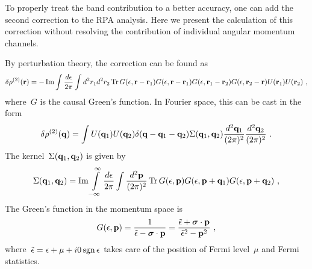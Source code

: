 \documentclass[preprint,aps,prb]{revtex4}
\begin{document}
To properly treat the band contribution to a better accuracy, one can
add the second correction to the RPA analysis. Here we present
the calculation of this correction without resolving the contribution
of individual angular momentum channels. 

By perturbation theory, the correction can be found as
\begin{equation}
\label{U2-initial}
\delta \rho^{(2)}({\bf r})
= -\mathop{\rm Im}\nolimits \int \frac{d\epsilon}{2\pi}
\int d^2 r_1 d^2 r_2 
\mathop{\rm Tr}\nolimits G(\epsilon, {\bf r} - {\bf r}_1 ) 
G(\epsilon, {\bf r} - {\bf r}_1) G(\epsilon, {\bf r}_1 - {\bf r}_2)
G(\epsilon, {\bf r}_2 - {\bf r}) U({\bf r}_1) U({\bf r}_2)
\ , 
\end{equation}
where~$G$ is the causal Green's function. 
In Fourier space, this can be cast in the form
\begin{equation}
\delta \rho^{(2)} ({\bf q}) = \int U({\bf q}_1) U({\bf q}_2) 
\delta({\bf q} - {\bf q}_1 - {\bf q}_2) \Sigma ({\bf q}_1, {\bf q}_2)
\frac{d^2{\bf q}_1}{(2\pi)^2}
\frac{d^2{\bf q}_2}{(2\pi)^2}
\ .
\end{equation}
The kernel~$\Sigma({\bf q}_1, {\bf q}_2)$ is given by 
\begin{equation}
\label{U2-momentum}
\Sigma({\bf q}_1, {\bf q}_2) 
=  \mathop{\rm Im}
   \int\limits_{-\infty}^{\infty} \frac{d\epsilon}{2\pi}
   \int\frac{d^2{\bf p}}{(2\pi)^2}
   \mathop{\rm Tr}\nolimits G(\epsilon, {\bf p}) G(\epsilon, {\bf p} +
   {\bf q}_1) G(\epsilon, {\bf p} + {\bf q}_2)
\ , 
\end{equation}
The Green's function in the momentum space is
\begin{equation}
G(\epsilon, {\bf p}) = \frac{1}{{\tilde\epsilon} - {\bm \sigma} \cdot {\bf p}}
= \frac{{\tilde\epsilon} + {\bm \sigma} \cdot {\bf p}}{
   {\tilde\epsilon}^2 - {\bf p}^2
   }
   \ , 
\end{equation}
where~$\tilde{\epsilon} = \epsilon + \mu + i 0 \mathop{\rm sgn}
\epsilon$
takes care of the position of Fermi level~$\mu$ and Fermi statistics. 
\end{document}
